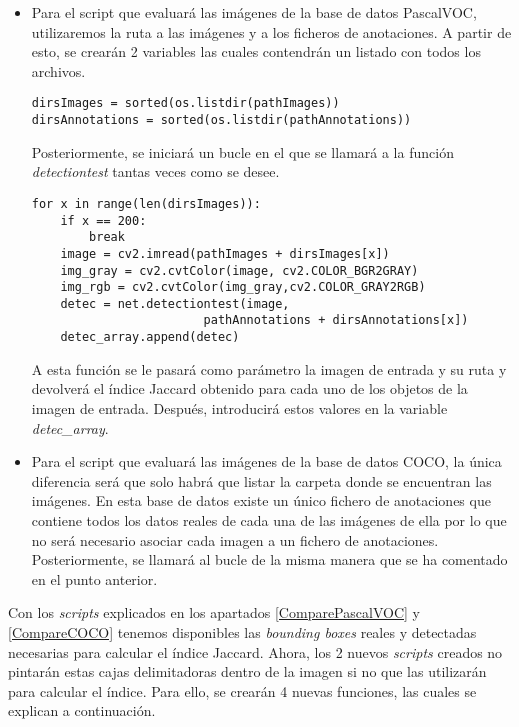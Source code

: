 \documentclass[a4paper, 12pt, spanish, chapterprefix, numbers=noenddot]{book}
\begin{document}
\begin{itemize}
\item Para el script que evaluará las imágenes de la base de datos PascalVOC, utilizaremos la ruta a las imágenes y a los ficheros de anotaciones. A partir de esto, se crearán 2 variables las cuales contendrán un listado con todos los archivos.\\

\begin{lstlisting}[frame=single]
dirsImages = sorted(os.listdir(pathImages))
dirsAnnotations = sorted(os.listdir(pathAnnotations))
\end{lstlisting}

Posteriormente, se iniciará un bucle en el que se llamará a la función \textit{detectiontest} tantas veces como se desee.\\

\begin{lstlisting}[frame=single]
for x in range(len(dirsImages)):
    if x == 200:
        break
    image = cv2.imread(pathImages + dirsImages[x])
    img_gray = cv2.cvtColor(image, cv2.COLOR_BGR2GRAY)
    img_rgb = cv2.cvtColor(img_gray,cv2.COLOR_GRAY2RGB)
    detec = net.detectiontest(image,
    					pathAnnotations + dirsAnnotations[x])
    detec_array.append(detec)
\end{lstlisting}

A esta función se le pasará como parámetro la imagen de entrada y su ruta y devolverá el índice Jaccard obtenido para cada uno de los objetos de la imagen de entrada. Después, introducirá estos valores en la variable \textit{detec\_array}.\\

\item Para el script que evaluará las imágenes de la base de datos COCO, la única diferencia será que solo habrá que listar la carpeta donde se encuentran las imágenes. En esta base de datos existe un único fichero de anotaciones que contiene todos los datos reales de cada una de las imágenes de ella por lo que no será necesario asociar cada imagen a un fichero de anotaciones. Posteriormente, se llamará al bucle de la misma manera que se ha comentado en el punto anterior.
\end{itemize}

Con los \textit{scripts} explicados en los apartados \ref{ComparePascalVOC} y \ref{CompareCOCO} tenemos disponibles las \textit{bounding boxes} reales y detectadas necesarias para calcular el índice Jaccard. Ahora, los 2 nuevos \textit{scripts} creados no pintarán estas cajas delimitadoras dentro de la imagen si no que las utilizarán para calcular el índice. Para ello, se crearán 4 nuevas funciones, las cuales se explican a continuación.\\ 
\end{document}
